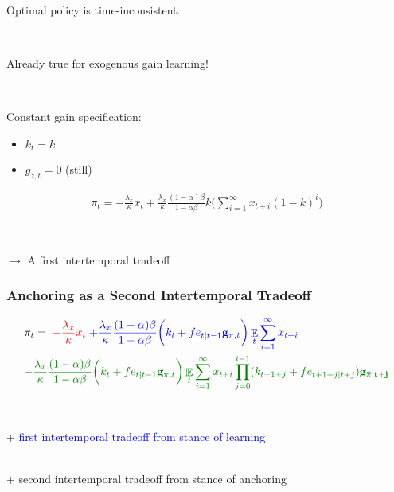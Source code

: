 \documentclass{beamer}
\DeclareMathOperator{\E}{\mathbb{E}}
\begin{document}
\begin{frame}
	\frametitle{}

\begin{corollary} Optimal policy is time-inconsistent. 
\end{corollary}

\

Already true for exogenous gain learning!  

\

Constant gain specification:

\begin{itemize}
\item $k_t = k$
\item $g_{z,t} = 0$ (still)
\end{itemize}


\begin{align}
\pi_t  = -\frac{\lambda_x}{\kappa} x_t + \frac{\lambda_x}{\kappa} \frac{(1-\alpha)\beta}{1-\alpha\beta} k
\bigg(\sum_{i=1}^{\infty}x_{t+i}(1-k)^i \bigg)
 \label{target_molnar} %
\end{align}


\

$\rightarrow$ A first intertemporal tradeoff
\end{frame}

\begin{frame}
	\frametitle{Anchoring as a Second Intertemporal Tradeoff}

\begin{align*}
& \pi_t  =  \; \textcolor{red}{-\frac{\lambda_x}{\kappa} x_t} \textcolor{blue}{ \; + \frac{\lambda_x}{\kappa} \frac{(1-\alpha)\beta}{1-\alpha\beta} \bigg(k_t+ fe_{t|t-1}\mathbf{g}_{\pi,t} \bigg)\E_t\sum_{i=1}^{\infty}x_{t+i}}  \\
& \textcolor{mygreen}{- \frac{\lambda_x}{\kappa} \frac{(1-\alpha)\beta}{1-\alpha\beta} \bigg(k_t+ fe_{t|t-1}\mathbf{g}_{\pi,t} \bigg)\E_t\sum_{i=1}^{\infty}x_{t+i}\prod_{j=0}^{i-1}(k_{t+1+j}+ fe_{t+1+j|t+j})\mathbf{g_{\bar{\pi},t+j}} }
\end{align*}

\

+ \textcolor{blue}{first intertemporal tradeoff from stance of learning} \\

\

+ \textcolor{mygreen}{second intertemporal tradeoff from stance of anchoring}

\end{frame}
\end{document}
